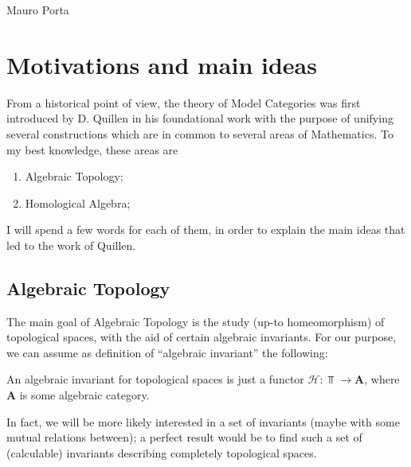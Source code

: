 \begin{refsection}
\begin{flushright}
Mauro Porta
\end{flushright}

\section{Motivations and main ideas}

From a historical point of view, the theory of Model Categories was first introduced by D. Quillen in his foundational work \cite{quillen} with the purpose of unifying several constructions which are in common to several areas of Mathematics. To my best knowledge, these areas are
\begin{enumerate}
\item Algebraic Topology;
\item Homological Algebra;
\end{enumerate}
I will spend a few words for each of them, in order to explain the main ideas that led to the work of Quillen.

\subsection{Algebraic Topology} \label{algebraic topology}

The main goal of Algebraic Topology is the study (up-to homeomorphism) of topological spaces, with the aid of certain algebraic invariants. For our purpose, we can assume as definition of ``algebraic invariant'' the following:
\begin{defin} \label{algebraic invariant}
An algebraic invariant for topological spaces is just a functor $\mathcal H \colon \Top \to \mathbf A$, where $\mathbf A$ is some algebraic category.
\end{defin}
In fact, we will be more likely interested in a set of invariants (maybe with some mutual relations between); a perfect result would be to find such a set of (calculable) invariants describing completely topological spaces.


\end{refsection}
